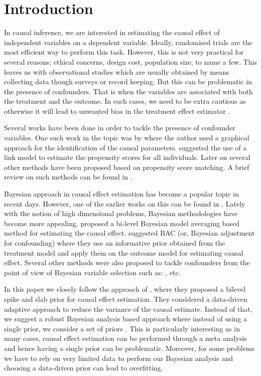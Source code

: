 \documentclass{amsart}
\begin{document}
\section{Introduction}\label{sec:intro}

In causal inference, we are interested in estimating the causal
effect of independent variables on a dependent variable. Ideally,
randomised trials are the most efficient way to perform this task.
However, this is not very practical for several reasons; ethical 
concerns, design cost, population size, to name a few. This
leaves us with observational studies which are usually obtained
by means collecting data though surveys or record keeping. But this
can be problematic in the presence of confounders. That is when
the variables are associated with both the treatment and the outcome.
In such cases, we need to be extra cautious as otherwise it will
lead to unwanted bias in the treatment effect estimator \cite{rosenbaum83}.

Several works have been done in order to tackle the presence of
confounder variables. One such work in the topic was 
by \citet{Robins1986ANA} where the author used  a graphical
approach for the identification of the causal parameters.
\citet{rosenbaum1985} suggested the use of a link model to estimate
the propensity scores for all individuals. Later on several other
methods have been proposed based on propensity score matching.
A brief review on such methods can be found in \cite{winship99, stuart10}.

Bayesian approach in causal effect estimation has become a popular
topic in recent days. However, one of the earlier works on this can be
found in \cite{rubin1978}. Lately with the notion of high dimensional problems, Bayesian methodologies have become
more appealing. \citet{Crainiceanu2008} proposed a bi-level 
Bayesian model averaging based method for estimating the causal 
effect. \citet{wang2015} suggested BAC (or, Bayesian adjustment for
confounding) where they use an informative prior obtained from
the treatment model and apply them on the outcome model for
estimating causal effect. Several other methods were also
proposed to tackle confounders from the point of view of Bayesian
variable selection such as: \citet{Zigler2014}, \citet{Hahn2018} etc.

In this paper we closely follow the approach of \citet{koch2020}, where
they proposed a bilevel spike and slab prior for causal effect 
estimation. They considered a data-driven adaptive approach to
reduce the variance of the causal estimate. Instead of that,
we suggest a robust Bayesian analysis based approach where instead
of using a single prior, we consider a set of priors \cite{BERGER1990303}. This is particularly interesting as in
many cases, causal effect estimation can be performed through a 
meta analysis and hence having a single prior can be problematic.
Moreover, for some problems we have to rely on very limited data to
perform our Bayesian analysis and choosing a data-driven prior
can lead to overfitting.
\end{document}

